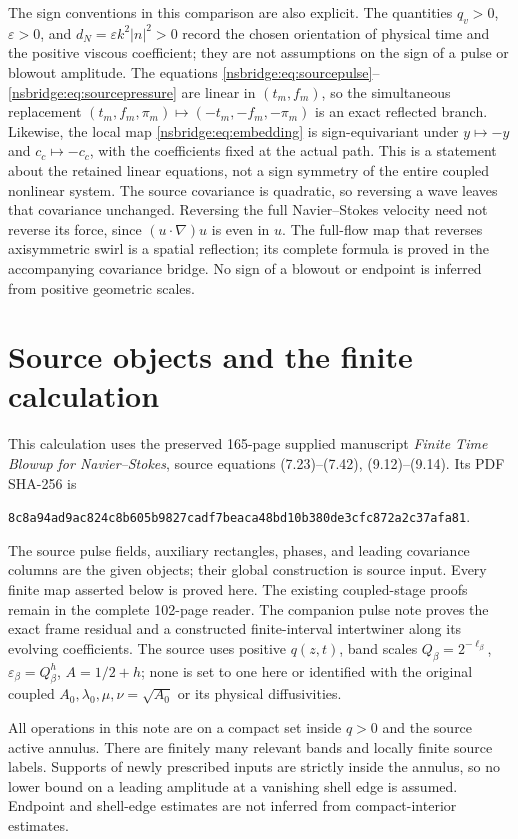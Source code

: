 \documentclass[11pt]{article}
\begin{document}
The sign conventions in this comparison are also explicit.  The quantities
$q_v>0$, $\varepsilon>0$, and $d_N=\varepsilon k^2|n|^2>0$ record the chosen
orientation of physical time and the positive viscous coefficient; they are
not assumptions on the sign of a pulse or blowout amplitude.  The equations
\eqref{nsbridge:eq:sourcepulse}--\eqref{nsbridge:eq:sourcepressure} are linear in $(t_m,f_m)$,
so the simultaneous replacement $(t_m,f_m,\pi_m)\mapsto
(-t_m,-f_m,-\pi_m)$ is an exact reflected branch.  Likewise, the local map
\eqref{nsbridge:eq:embedding} is sign-equivariant under $y\mapsto-y$ and
$c_c\mapsto-c_c$, with the coefficients fixed at the actual path.
This is a statement about the retained linear equations, not a sign symmetry
of the entire coupled nonlinear system.
The source covariance is quadratic, so reversing a wave leaves that
covariance unchanged. Reversing the full Navier--Stokes velocity need not
reverse its force, since $(u\cdot\nabla)u$ is even in $u$.
The full-flow map that reverses axisymmetric swirl is a spatial reflection;
its complete formula is proved in the accompanying covariance bridge.
No sign of a blowout or endpoint is inferred from positive geometric scales.


\section{Source objects and the finite calculation}
This calculation uses the preserved 165-page supplied manuscript
\emph{Finite Time Blowup for Navier--Stokes}, source equations
(7.23)--(7.42), (9.12)--(9.14). Its PDF SHA-256 is
\begin{center}\small
\texttt{8c8a94ad9ac824c8b605b9827cadf7beaca48bd10b380de3cfc872a2c37afa81}.
\end{center}
The source pulse fields, auxiliary rectangles, phases, and leading
covariance columns are the given objects; their global construction is
source input. Every finite map asserted below is proved here. The existing
coupled-stage proofs remain in the complete 102-page reader. The companion
pulse note proves the exact frame residual and a constructed finite-interval
intertwiner along its evolving coefficients. The source uses positive
$q(z,t)$, band scales $Q_\beta=2^{-\ell_\beta}$,
$\varepsilon_\beta=Q_\beta^h$, $A=1/2+h$; none is set to one here or
identified with the original coupled $A_0,\lambda_0,\mu,\nu=\sqrt{A_0}$
or its physical diffusivities.

All operations in this note are on a compact set inside $q>0$ and the
source active annulus. There are finitely many relevant bands and
locally finite source labels. Supports of newly prescribed inputs are
strictly inside the annulus, so no lower bound on a leading amplitude
at a vanishing shell edge is assumed. Endpoint and shell-edge estimates
are not inferred from compact-interior estimates.
\end{document}
